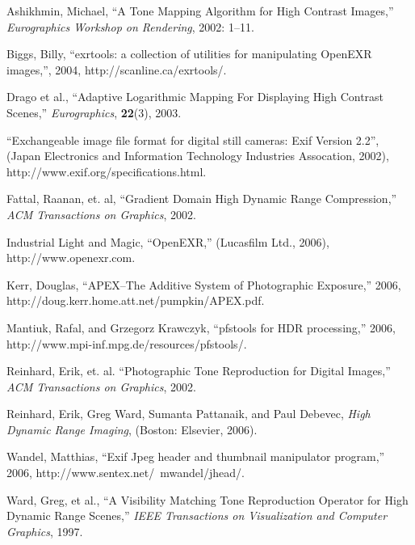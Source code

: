 \begin{thebibliography}{1}

 Ashikhmin, Michael, ``A Tone Mapping Algorithm for High Contrast Images,''
{\em Eurographics Workshop on Rendering}, 2002: 1--11.

 Biggs, Billy, ``exrtools: a collection of utilities for manipulating
OpenEXR images,'', 2004, http://scanline.ca/exrtools/.

 Drago et al., ``Adaptive Logarithmic Mapping For Displaying High Contrast Scenes,''
{\em Eurographics}, {\bf 22}(3), 2003.

 ``Exchangeable image file format for digital still cameras: Exif Version 2.2'',
(Japan Electronics and Information Technology Industries Assocation, 2002),
http://www.exif.org/specifications.html.

 Fattal, Raanan, et. al, ``Gradient Domain High Dynamic Range Compression,''
{\em ACM Transactions on Graphics}, 2002.

 Industrial Light and Magic, ``OpenEXR,'' (Lucasfilm Ltd., 2006),
http://www.openexr.com.

 Kerr, Douglas, ``APEX--The Additive System of Photographic Exposure,'' 2006,
http://doug.kerr.home.att.net/pumpkin/APEX.pdf.

 Mantiuk, Rafal, and Grzegorz Krawczyk, ``pfstools for HDR processing,'' 2006,
http://www.mpi-inf.mpg.de/resources/pfstools/.

 Reinhard, Erik, et. al. ``Photographic Tone Reproduction for Digital Images,''
{\em ACM Transactions on Graphics}, 2002.

 Reinhard, Erik, Greg Ward, Sumanta Pattanaik, and Paul Debevec,
{\em High Dynamic Range Imaging}, (Boston: Elsevier, 2006).

 Wandel, Matthias, ``Exif Jpeg header and thumbnail manipulator program,'' 2006,
http://www.sentex.net/~mwandel/jhead/.

 Ward, Greg, et al., ``A Visibility Matching Tone Reproduction Operator for High Dynamic Range Scenes,''
{\em IEEE Transactions on Visualization and Computer Graphics}, 1997.

\end{thebibliography}
